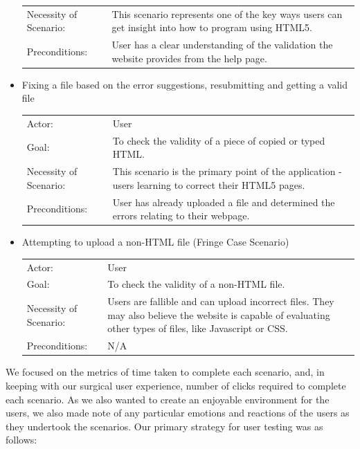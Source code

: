 \documentclass[10pt]{article}
\begin{document}
\begin{itemize}
\begin{tabular}{l p{3.5in}}
Necessity of Scenario: & This scenario represents one of the key ways users can get insight into how to program using HTML5. \\
Preconditions: & User has a clear understanding of the validation the website provides from the help page. \\
\end{tabular}
\item Fixing a file based on the error suggestions, resubmitting and getting a valid file \\
\begin{tabular}{l p{3.5in}}
Actor: & User \\
Goal: & To check the validity of a piece of copied or typed HTML. \\
Necessity of Scenario: & This scenario is the primary point of the application - users learning to correct their HTML5 pages. \\
Preconditions: & User has already uploaded a file and determined the errors relating to their webpage. \\
\end{tabular}
\item Attempting to upload a non-HTML file (Fringe Case Scenario) \\
\begin{tabular}{l p{3.5in}}
Actor: & User \\
Goal: & To check the validity of a non-HTML file. \\
Necessity of Scenario: & Users are fallible and can upload incorrect files. They may also believe the website is capable of evaluating other types of files, like Javascript or CSS. \\
Preconditions: & N/A \\
\end{tabular}
\end{itemize}

We focused on the metrics of time taken to complete each scenario, and, in keeping with our surgical user experience, number of clicks required to complete each scenario. As we also wanted to create an enjoyable environment for the users, we also made note of any particular emotions and reactions of the users as they undertook the scenarios. Our primary strategy for user testing was as follows:
\end{document}
